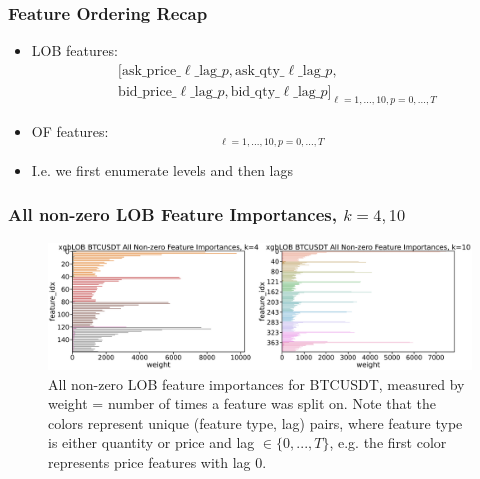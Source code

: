 \documentclass[handout]{beamer}
\begin{document}
\begin{frame}
    \frametitle{Feature Ordering Recap}
     \begin{itemize}
        \item LOB features:
            \begin{equation*}
                \begin{aligned}
                    &[\text{ask}\_\text{price}\_\ell\_\text{lag}\_p, \text{ask}\_\text{qty}\_\ell\_\text{lag}\_p, \\
                    &\text{bid}\_\text{price}\_\ell\_\text{lag}\_p, \text{bid}\_\text{qty}\_\ell\_\text{lag}\_p]_{\ell = 1, ..., 10, p = 0, ..., T}
                \end{aligned}
            \end{equation*}
        \item OF features:
            \begin{equation*}
                [\text{ask}\_\text{orderflow}\_\ell\_\text{lag}\_p, \text{bid}\_\text{orderflow}\_\ell\_\text{lag}\_p]_{\ell = 1, ..., 10, p = 0, ..., T}
            \end{equation*}
        \item I.e. we first enumerate levels and then lags
    \end{itemize}
\end{frame}

\begin{frame}
    \frametitle{All non-zero LOB Feature Importances, $k=4, 10$}
        \begin{figure}[htpb!]
            \centering
            \includegraphics[width=1.0\textwidth]{./images/xgboost_LOB_BTCUSDT_all_feature_importances_1.pdf}
            \caption{All non-zero LOB feature importances for BTCUSDT, measured by weight = number of times a feature was split on.
            Note that the colors represent unique (feature type, lag) pairs, where feature type is either quantity or price and lag $\in \{0, ..., T\} $,
            e.g. the first color represents price features with lag 0.}
        \end{figure}
\end{frame}
\end{document}
